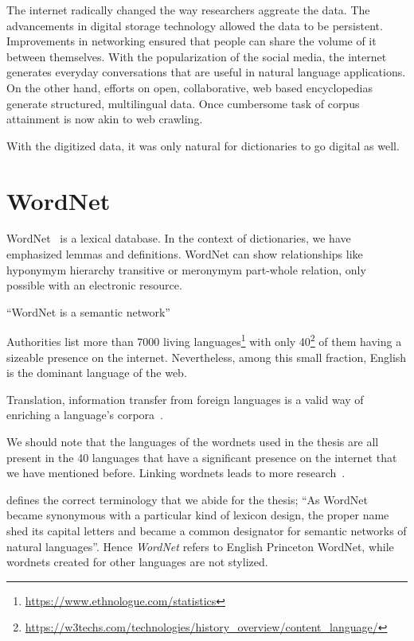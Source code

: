 The internet radically changed the way researchers aggreate the data.
The advancements in digital storage technology allowed the data to be persistent.
Improvements in networking ensured that people can share the volume of it between themselves.
With the popularization of the social media, the internet generates everyday conversations that are useful in natural language applications.
On the other hand, efforts on open, collaborative, web based encyclopedias generate structured, multilingual data.
Once cumbersome task of corpus attainment is now akin to web crawling.

With the digitized data, it was only natural for dictionaries to go digital as well.
\section{WordNet}%
\label{sec:wordnet}
WordNet~\cite{fellbaum_wordnet_1998-1} is a lexical database.
In the context of dictionaries, we have emphasized lemmas and definitions.
WordNet can show relationships like hyponymym hierarchy transitive or meronymym part-whole relation, only possible with an electronic resource.

\enquote{WordNet is a semantic network}\cite{fellbaum_wordnet_1998-1}

Authorities list more than 7000 living languages\footnote{\url{https://www.ethnologue.com/statistics}} with only 40\footnote{\url{https://w3techs.com/technologies/history_overview/content_language/}} of them having a sizeable presence on the internet.
Nevertheless, among this small fraction, English is the dominant language of the web.

Translation, information transfer from foreign languages is a valid way of enriching a language's corpora~\cite{ibrahim_usta_turkce_2006}.

We should note that the languages of the wordnets used in the thesis are all present in the 40 languages that have a significant presence on the internet that we have mentioned before.
Linking wordnets leads to more research~\cite{sagot_building_2008}.

\textcite{fellbaum_semantic_1998} defines the correct terminology that we abide for the thesis; \enquote{As WordNet became synonymous with a particular kind of lexicon design, the proper name shed its capital letters and became a common designator for semantic networks of natural languages}.
Hence \emph{WordNet} refers to English Princeton WordNet, while wordnets created for other languages are not stylized.

